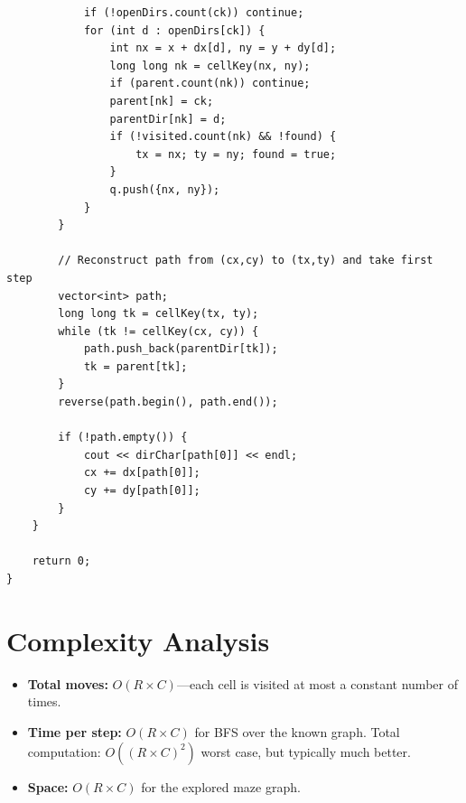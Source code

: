 \documentclass[11pt,a4paper]{article}
\begin{document}
\begin{lstlisting}
            if (!openDirs.count(ck)) continue;
            for (int d : openDirs[ck]) {
                int nx = x + dx[d], ny = y + dy[d];
                long long nk = cellKey(nx, ny);
                if (parent.count(nk)) continue;
                parent[nk] = ck;
                parentDir[nk] = d;
                if (!visited.count(nk) && !found) {
                    tx = nx; ty = ny; found = true;
                }
                q.push({nx, ny});
            }
        }

        // Reconstruct path from (cx,cy) to (tx,ty) and take first step
        vector<int> path;
        long long tk = cellKey(tx, ty);
        while (tk != cellKey(cx, cy)) {
            path.push_back(parentDir[tk]);
            tk = parent[tk];
        }
        reverse(path.begin(), path.end());

        if (!path.empty()) {
            cout << dirChar[path[0]] << endl;
            cx += dx[path[0]];
            cy += dy[path[0]];
        }
    }

    return 0;
}
\end{lstlisting}

\section{Complexity Analysis}
\begin{itemize}
  \item \textbf{Total moves:} $O(R \times C)$---each cell is visited at
        most a constant number of times.
  \item \textbf{Time per step:} $O(R \times C)$ for BFS over the known
        graph. Total computation: $O((R \times C)^2)$ worst case, but
        typically much better.
  \item \textbf{Space:} $O(R \times C)$ for the explored maze graph.
\end{itemize}
\end{document}
